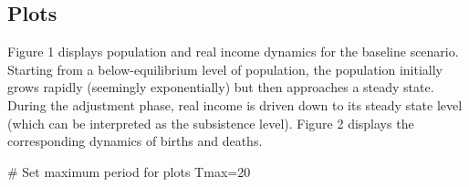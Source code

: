\documentclass[
  letterpaper,
  DIV=11,
  numbers=noendperiod]{scrreprt}
\newenvironment{Shaded}{\begin{snugshade}}{\end{snugshade}}
\newcommand{\CommentTok}[1]{\textcolor[rgb]{0.37,0.37,0.37}{#1}}
\newcommand{\DecValTok}[1]{\textcolor[rgb]{0.68,0.00,0.00}{#1}}
\newcommand{\NormalTok}[1]{\textcolor[rgb]{0.00,0.23,0.31}{#1}}
\newcommand{\OtherTok}[1]{\textcolor[rgb]{0.00,0.23,0.31}{#1}}
\begin{document}
\subsection{Plots}\label{plots-9}

Figure 1 displays population and real income dynamics for the baseline
scenario. Starting from a below-equilibrium level of population, the
population initially grows rapidly (seemingly exponentially) but then
approaches a steady state. During the adjustment phase, real income is
driven down to its steady state level (which can be interpreted as the
subsistence level). Figure 2 displays the corresponding dynamics of
births and deaths.

\begin{Shaded}
\begin{Highlighting}[]
\CommentTok{\# Set maximum period for plots}
\NormalTok{Tmax}\OtherTok{=}\DecValTok{20}


\end{Highlighting}
\end{Shaded}
\end{document}
